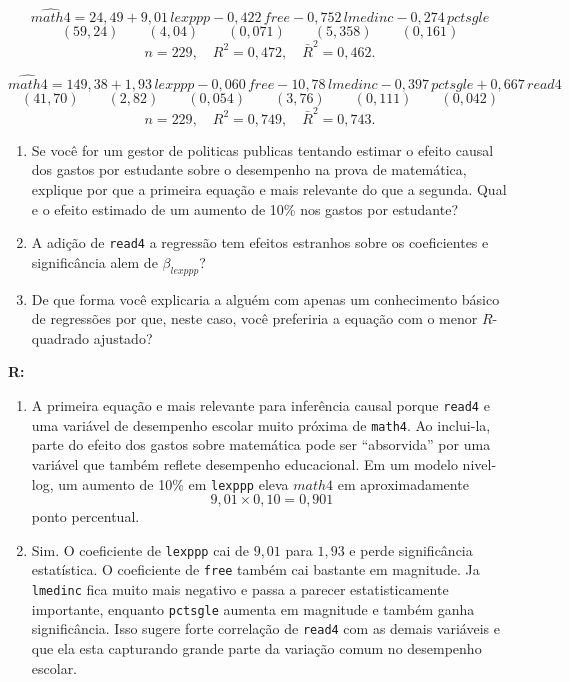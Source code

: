 \documentclass[12pt,letterpaper, onecolumn]{exam}
\renewenvironment{solution}
{\par\noindent\textbf{R:}\enspace\color{blue}}
{\par\color{black}}
\begin{document}
\begin{questions}
\[
\widehat{math4} = 24{,}49 + 9{,}01\,lexppp - 0{,}422\,free - 0{,}752\,lmedinc - 0{,}274\,pctsgle
\]
\[
(59{,}24)\qquad (4{,}04)\qquad (0{,}071)\qquad (5{,}358)\qquad (0{,}161)
\]
\[
n = 229,\quad R^2 = 0{,}472,\quad \bar{R}^2 = 0{,}462.
\]

\[
\widehat{math4} = 149{,}38 + 1{,}93\,lexppp - 0{,}060\,free - 10{,}78\,lmedinc - 0{,}397\,pctsgle + 0{,}667\,read4
\]
\[
(41{,}70)\qquad (2{,}82)\qquad (0{,}054)\qquad (3{,}76)\qquad (0{,}111)\qquad (0{,}042)
\]
\[
n = 229,\quad R^2 = 0{,}749,\quad \bar{R}^2 = 0{,}743.
\]

\begin{enumerate}[label=(\roman*)]
    \item Se você for um gestor de politicas publicas tentando estimar o efeito causal dos gastos por estudante sobre o desempenho na prova de matemática, explique por que a primeira equação e mais relevante do que a segunda. Qual e o efeito estimado de um aumento de 10\% nos gastos por estudante?

    \item A adição de \texttt{read4} a regressão tem efeitos estranhos sobre os coeficientes e significância alem de \(\beta_{lexppp}\)?

    \item De que forma você explicaria a alguém com apenas um conhecimento básico de regressões por que, neste caso, você preferiria a equação com o menor \(R\)-quadrado ajustado?
\end{enumerate}

\begin{solution}
\begin{enumerate}[label=(\roman*)]
    \item A primeira equação e mais relevante para inferência causal porque \texttt{read4} e uma variável de desempenho escolar muito próxima de \texttt{math4}. Ao inclui-la, parte do efeito dos gastos sobre matemática pode ser ``absorvida'' por uma variável que também reflete desempenho educacional. Em um modelo nivel-log, um aumento de 10\% em \texttt{lexppp} eleva \(math4\) em aproximadamente
    \[
    9{,}01 \times 0{,}10 = 0{,}901
    \]
    ponto percentual.

    \item Sim. O coeficiente de \texttt{lexppp} cai de \(9{,}01\) para \(1{,}93\) e perde significância estatística. O coeficiente de \texttt{free} também cai bastante em magnitude. Ja \texttt{lmedinc} fica muito mais negativo e passa a parecer estatisticamente importante, enquanto \texttt{pctsgle} aumenta em magnitude e também ganha significância. Isso sugere forte correlação de \texttt{read4} com as demais variáveis e que ela esta capturando grande parte da variação comum no desempenho escolar.


\end{enumerate}
\end{solution}
\end{questions}
\end{document}
